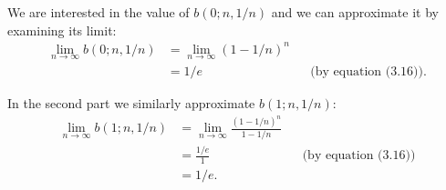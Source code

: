 \starred
We are interested in the value of $b(0;n,1/n)$ and we can approximate it by examining its limit:
\begin{align*}
    \lim_{n\to\infty}b(0;n,1/n) &= \lim_{n\to\infty}(1-1/n)^n \\
    &= 1/e && \text{(by equation (3.16))}.
\end{align*}

In the second part we similarly approximate $b(1;n,1/n)$:
\begin{align*}
    \lim_{n\to\infty}b(1;n,1/n) &= \lim_{n\to\infty}\frac{(1-1/n)^n}{1-1/n} \\
    &= \frac{1/e}{1} && \text{(by equation (3.16))} \\[1mm]
    &= 1/e.
\end{align*}
